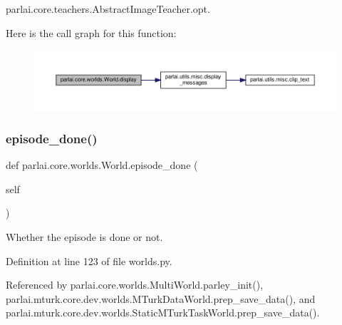 parlai.\+core.\+teachers.\+Abstract\+Image\+Teacher.\+opt.

Here is the call graph for this function\+:
\nopagebreak
\begin{figure}[H]
\begin{center}
\leavevmode
\includegraphics[width=350pt]{classparlai_1_1core_1_1worlds_1_1World_a147371097765449933ca963215eba603_cgraph}
\end{center}
\end{figure}
\mbox{\label{classparlai_1_1core_1_1worlds_1_1World_aaaef76f5bae4cdbe8f78241f8cd7c3a3}} 
\subsubsection{\texorpdfstring{episode\+\_\+done()}{episode\_done()}}
{\footnotesize\ttfamily def parlai.\+core.\+worlds.\+World.\+episode\+\_\+done (\begin{DoxyParamCaption}\item[{}]{self }\end{DoxyParamCaption})}

\begin{DoxyVerb}Whether the episode is done or not.\end{DoxyVerb}
 

Definition at line 123 of file worlds.\+py.



Referenced by parlai.\+core.\+worlds.\+Multi\+World.\+parley\+\_\+init(), parlai.\+mturk.\+core.\+dev.\+worlds.\+M\+Turk\+Data\+World.\+prep\+\_\+save\+\_\+data(), and parlai.\+mturk.\+core.\+dev.\+worlds.\+Static\+M\+Turk\+Task\+World.\+prep\+\_\+save\+\_\+data().

